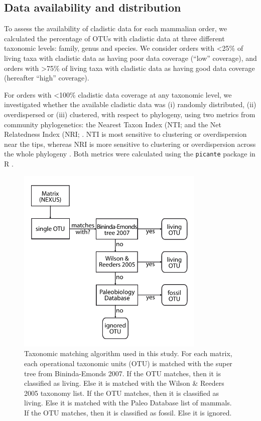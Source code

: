 \subsection{Data availability and distribution}
To assess the availability of cladistic data for each mammalian order, we calculated the percentage of OTUs with cladistic data at three different taxonomic levels: family, genus and species.
We consider orders with \textless 25\% of living taxa with cladistic data as having poor data coverage (``low'' coverage), and orders with \textgreater 75\% of living taxa with cladistic data as having good data coverage (hereafter ``high'' coverage). 

For orders with \textless 100\% cladistic data coverage at any taxonomic level, we investigated whether the available cladistic data was (i) randomly distributed, (ii) overdispersed or (iii) clustered, with respect to phylogeny, using two metrics from community phylogenetics: the Nearest Taxon Index (NTI; \citep{webb2002phylogenies} and the Net Relatedness Index (NRI; \citep{webb2002phylogenies}. 
NTI is most sensitive to clustering or overdispersion near the tips, whereas NRI is more sensitive to clustering or overdispersion across the whole phylogeny \citep{Cooper2008}. 
Both metrics were calculated using the \texttt{picante} package in R \citep{picante,R}.

\begin{figure}[!h]
\centering
    \includegraphics[width=0.8\textwidth]{Missing_mammals/Figures/Supp_figure_Taxonomic_algorithm.pdf}
\caption[Taxonomic matching algorithm used in this study]{Taxonomic matching algorithm used in this study. For each matrix, each operational taxonomic units (OTU) is matched with the super tree from Bininda-Emonds 2007. If the OTU matches, then it is classified as living. Else it is matched with the Wilson \& Reeders 2005 taxonomy list. If the OTU matches, then it is classified as living. Else it is matched with the Paleo Database list of mammals. If the OTU matches, then it is classified as fossil. Else it is ignored.}
\label{Supp_figure_Taxonomic_algorithm}
\end{figure}

